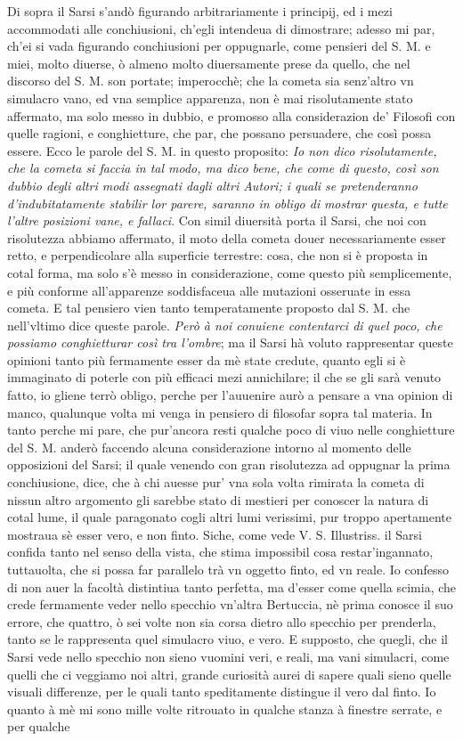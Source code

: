 \documentclass[11pt,twoside,openany]{book}
\begin{document}
Di sopra il Sarsi s'andò figurando arbitrariamente i principij, ed i mezi accommodati alle conchiusioni, ch'egli intendeua di dimostrare; adesso mi par, ch'ei si vada figurando conchiusioni per oppugnarle, come pensieri del S. M. e miei, molto diuerse, ò almeno molto diuersamente prese da quello, che nel discorso del S. M. son portate; imperocchè; che la cometa sia senz'altro vn simulacro vano, ed vna semplice apparenza, non è mai risolutamente stato affermato, ma solo messo in dubbio, e promosso alla considerazion de' Filosofi con quelle ragioni, e conghietture, che par, che possano persuadere, che così possa essere. Ecco le parole del S. M. in questo proposito: \textit{Io non dico risolutamente, che la cometa si faccia in tal modo, ma dico bene, che come di questo, così son dubbio degli altri modi assegnati dagli altri Autori; i quali se pretenderanno d'indubitatamente stabilir lor parere, saranno in obligo di }\textit{mostrar questa, e tutte l'altre posizioni vane, e fallaci}. Con simil diuersità porta il Sarsi, che noi con risolutezza abbiamo affermato, il moto della cometa douer necessariamente esser retto, e perpendicolare alla superficie terrestre: cosa, che non si è proposta in cotal forma, ma solo s'è messo in considerazione, come questo più semplicemente, e più conforme all'apparenze soddisfaceua alle mutazioni osseruate in essa cometa. E tal pensiero vien tanto temperatamente proposto dal S. M. che nell'vltimo dice queste parole. \textit{Però à noi conuiene contentarci di quel poco, che possiamo conghietturar così tra l'ombre}; ma il Sarsi hà voluto rappresentar queste opinioni tanto più fermamente esser da mè state credute, quanto egli si è immaginato di poterle con più efficaci mezi annichilare; il che se gli sarà venuto fatto, io gliene terrò obligo, perche per l'auuenire aurò a pensare a vna opinion di manco, qualunque volta mi venga in pensiero di filosofar sopra tal materia. In tanto perche mi pare, che pur'ancora resti qualche poco di viuo nelle conghietture del S. M. anderò faccendo alcuna considerazione intorno al momento delle opposizioni del Sarsi; il quale venendo con gran risolutezza ad oppugnar la prima conchiusione, dice, che à chi auesse pur' vna sola volta rimirata la cometa di nissun altro argomento gli sarebbe stato di mestieri per conoscer la natura di cotal lume, il quale paragonato cogli altri lumi verissimi, pur troppo apertamente mostraua sè esser vero, e non finto. Siche, come vede V. S. Illustriss. il Sarsi confida tanto nel senso della vista, che stima impossibil cosa restar'ingannato, tuttauolta, che si possa far parallelo trà vn oggetto finto, ed vn reale. Io confesso di non auer la facoltà distintiua tanto perfetta, ma d'esser come quella scimia, che crede fermamente veder nello specchio vn'altra Bertuccia, nè prima conosce il suo errore, che quattro, ò sei volte non sia corsa dietro allo specchio per prenderla, tanto se le rappresenta quel simulacro viuo, e vero. E supposto, che quegli, che il Sarsi vede nello specchio non sieno vuomini veri, e reali, ma vani simulacri, come quelli che ci veggiamo noi altri, grande curiosità aurei di sapere quali sieno quelle visuali differenze, per le quali tanto speditamente distingue il vero dal finto. Io quanto à mè mi sono mille volte ritrouato in qualche stanza à finestre serrate, e per qualche 
\end{document}
